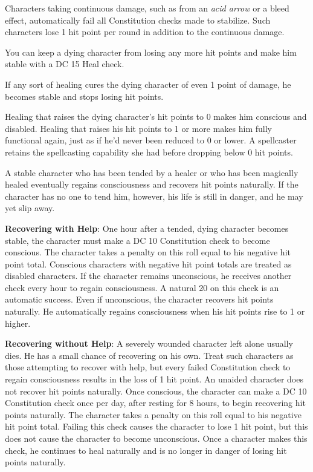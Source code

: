 Characters taking continuous damage, such as from an \textit{acid arrow} or a bleed effect, automatically fail all Constitution checks made to stabilize. Such characters lose 1 hit point per round in addition to the continuous damage. 
				
You can keep a dying character from losing any more hit points and make him stable with a DC 15 Heal check.
				
If any sort of healing cures the dying character of even 1 point of damage, he becomes stable and stops losing hit points.
				
Healing that raises the dying character's hit points to 0 makes him conscious and disabled. Healing that raises his hit points to 1 or more makes him fully functional again, just as if he'd never been reduced to 0 or lower. A spellcaster retains the spellcasting capability she had before dropping below 0 hit points.
				
A stable character who has been tended by a healer or who has been magically healed eventually regains consciousness and recovers hit points naturally. If the character has no one to tend him, however, his life is still in danger, and he may yet slip away.
				
\textbf{Recovering with Help}: One hour after a tended, dying character becomes stable, the character must make a DC 10 Constitution check to become conscious. The character takes a penalty on this roll equal to his negative hit point total. Conscious characters with negative hit point totals are treated as disabled characters. If the character remains unconscious, he receives another check every hour to regain consciousness. A natural 20 on this check is an automatic success. Even if unconscious, the character recovers hit points naturally. He automatically regains consciousness when his hit points rise to 1 or higher.
				
\textbf{Recovering without Help}: A severely wounded character left alone usually dies. He has a small chance of recovering on his own. Treat such characters as those attempting to recover with help, but every failed Constitution check to regain consciousness results in the loss of 1 hit point. An unaided character does not recover hit points naturally. Once conscious, the character can make a DC 10 Constitution check once per day, after resting for 8 hours, to begin recovering hit points naturally. The character takes a penalty on this roll equal to his negative hit point total. Failing this check causes the character to lose 1 hit point, but this does not cause the character to become unconscious. Once a character makes this check, he continues to heal naturally and is no longer in danger of losing hit points naturally.
				
